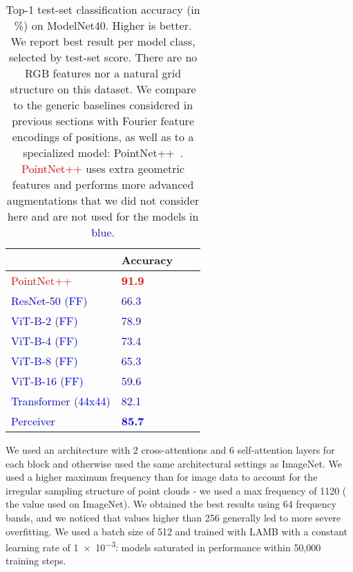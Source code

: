 \documentclass{article}
\begin{document}
\begin{table}[t]
\centering
\begin{tabular}{|l|l|l|l|}
\hline
                                                      & Accuracy                         \\ \hline
\textcolor{red}{PointNet++~\cite{qi2017pointnet++}}   &  \textcolor{red}{\textbf{91.9}}  \\ \hline
\textcolor{blue}{ResNet-50 (FF)}                      &  \textcolor{blue}{66.3}          \\        
\textcolor{blue}{ViT-B-2 (FF)}                        &  \textcolor{blue}{78.9}          \\        
\textcolor{blue}{ViT-B-4 (FF)}                        &  \textcolor{blue}{73.4}          \\        
\textcolor{blue}{ViT-B-8 (FF)}                        &  \textcolor{blue}{65.3}          \\        
\textcolor{blue}{ViT-B-16 (FF)}                       &  \textcolor{blue}{59.6}          \\        
\textcolor{blue}{Transformer (44x44)}                 &  \textcolor{blue}{82.1}          \\ \hline
\textcolor{blue}{Perceiver}                           &  \textcolor{blue}{\textbf{85.7}} \\ \hline

\end{tabular}
\caption{Top-1 test-set classification accuracy (in \%) on ModelNet40. Higher is better. We report best result per model class, selected by test-set score. There are no RGB features nor a natural grid structure on this dataset. We compare to the generic baselines considered in previous sections with Fourier feature encodings of positions, as well as to a specialized model: PointNet++~\cite{qi2017pointnet++}. \textcolor{red}{PointNet++} uses extra geometric features and performs more advanced augmentations that we did not consider here and are not used for the models in \textcolor{blue}{blue}. 
\label{modelnet40}}
\vspace{-12pt}
\end{table}

We used an architecture with 2 cross-attentions and 6 self-attention layers for each block and otherwise used the same architectural settings as ImageNet.  We used a higher maximum frequency than for image data to account for the irregular sampling structure of point clouds - we used a max frequency of 1120 ( the value used on ImageNet). We obtained the best results using 64 frequency bands, and we noticed that values higher than 256 generally led to more severe overfitting. We used a batch size of 512 and trained with LAMB with a constant learning rate of \num{1e-3}: models saturated in performance within 50,000 training steps.
\end{document}
